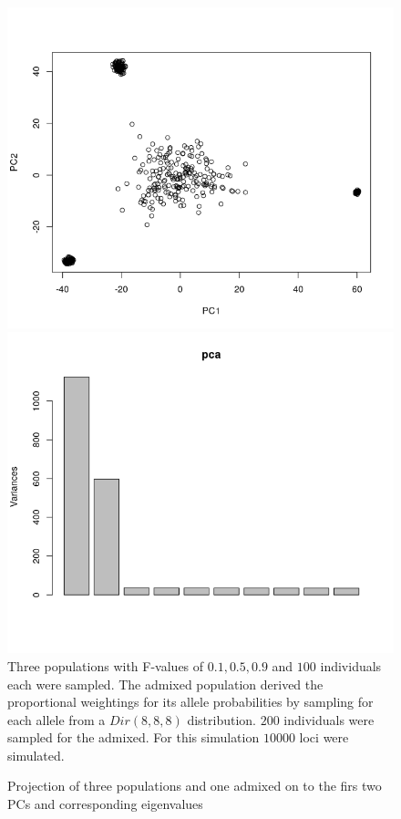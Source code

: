 \documentclass[a4paper, 11pt]{article}
\begin{document}
\begin{figure}[h!]
\caption{Projection of three populations and one admixed on to the firs two PCs and corresponding eigenvalues}
\includegraphics[scale=0.41]{Rplot_projection}
\includegraphics[scale=0.41]{Rplot_eigenvalues}
\\Three populations with F-values  of $0.1, 0.5, 0.9$ and $100$ individuals each were sampled. The admixed population derived the proportional weightings for its allele probabilities by sampling for each allele from a $Dir(8, 8, 8)$ distribution. $200$ individuals were sampled for the admixed. For this simulation $10000$ loci were simulated.
\centering
\end{figure}
\end{document}
